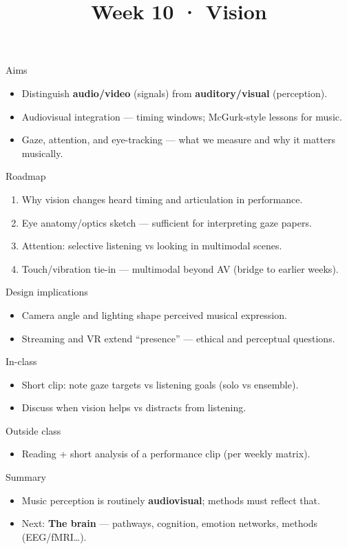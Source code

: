 \documentclass[aspectratio=169]{beamer}
\title{Week 10 · Vision}
\subtitle{\coursename}
\institute{\instituteuo}
\date{}
\begin{document}
\begin{frame}
  \titlepage
\end{frame}

\begin{frame}{Aims}
  \begin{itemize}
    \item Distinguish \textbf{audio/video} (signals) from \textbf{auditory/visual} (perception).
    \item Audiovisual integration — timing windows; McGurk-style lessons for music.
    \item Gaze, attention, and eye-tracking — what we measure and why it matters musically.
  \end{itemize}
\end{frame}

\begin{frame}{Roadmap}
  \begin{enumerate}
    \item Why vision changes heard timing and articulation in performance.
    \item Eye anatomy/optics sketch — sufficient for interpreting gaze papers.
    \item Attention: selective listening vs looking in multimodal scenes.
    \item Touch/vibration tie-in — multimodal beyond AV (bridge to earlier weeks).
  \end{enumerate}
\end{frame}

\begin{frame}{Design implications}
  \begin{itemize}
    \item Camera angle and lighting shape perceived musical expression.
    \item Streaming and VR extend ``presence'' — ethical and perceptual questions.
  \end{itemize}
\end{frame}

\begin{frame}{In-class}
  \begin{itemize}
    \item Short clip: note gaze targets vs listening goals (solo vs ensemble).
    \item Discuss when vision helps vs distracts from listening.
  \end{itemize}
\end{frame}

\begin{frame}{Outside class}
  \begin{itemize}
    \item Reading + short analysis of a performance clip (per weekly matrix).
  \end{itemize}
\end{frame}

\begin{frame}{Summary}
  \begin{itemize}
    \item Music perception is routinely \textbf{audiovisual}; methods must reflect that.
    \item Next: \textbf{The brain} — pathways, cognition, emotion networks, methods (EEG/fMRI\ldots).
  \end{itemize}
\end{frame}
\end{document}
